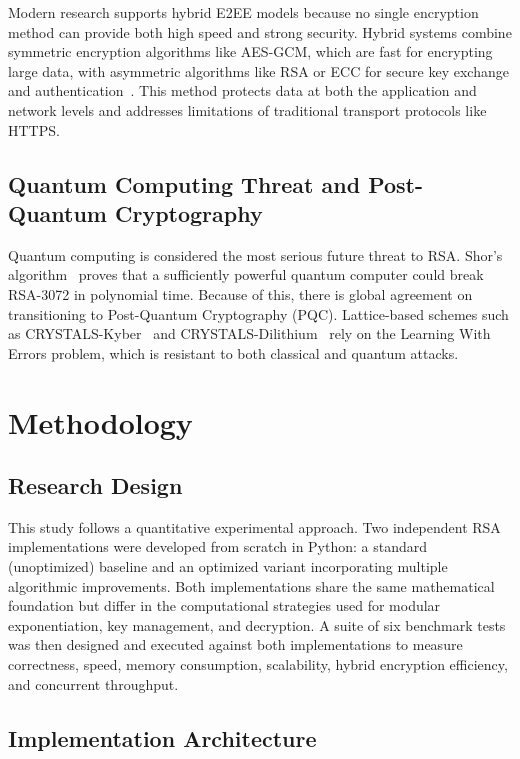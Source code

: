 \documentclass[conference]{IEEEtran}
\begin{document}
Modern research supports hybrid E2EE models because no single encryption method can provide both high speed and strong security. Hybrid systems combine symmetric encryption algorithms like AES-GCM, which are fast for encrypting large data, with asymmetric algorithms like RSA or ECC for secure key exchange and authentication~\cite{menezes2001}. This method protects data at both the application and network levels and addresses limitations of traditional transport protocols like HTTPS.

\subsection{Quantum Computing Threat and Post-Quantum Cryptography}

Quantum computing is considered the most serious future threat to RSA. Shor's algorithm~\cite{shor1997} proves that a sufficiently powerful quantum computer could break RSA-3072 in polynomial time. Because of this, there is global agreement on transitioning to Post-Quantum Cryptography (PQC). Lattice-based schemes such as CRYSTALS-Kyber~\cite{kyber2023} and CRYSTALS-Dilithium~\cite{dilithium2022} rely on the Learning With Errors problem, which is resistant to both classical and quantum attacks.

\section{Methodology}
\label{sec:methodology}

\subsection{Research Design}

This study follows a quantitative experimental approach. Two independent RSA implementations were developed from scratch in Python: a standard (unoptimized) baseline and an optimized variant incorporating multiple algorithmic improvements. Both implementations share the same mathematical foundation but differ in the computational strategies used for modular exponentiation, key management, and decryption. A suite of six benchmark tests was then designed and executed against both implementations to measure correctness, speed, memory consumption, scalability, hybrid encryption efficiency, and concurrent throughput.

\subsection{Implementation Architecture}
\end{document}
